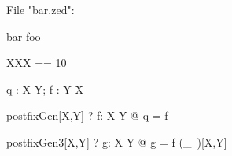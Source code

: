 
File "bar.zed":
\begin{zsection}
 \SECTION bar \parents foo
\end{zsection}

\begin{zed}
   XXX == 10
\end{zed}

\begin{gendef}[X,Y]
    q : X \fun Y; f : Y \fun X
\end{gendef}

\begin{theorem}{postfixGen}[X,Y]
   \vdash? \forall f: X \pfun Y @ q = f\inv
\end{theorem}


\begin{theorem}{postfixGen3}[X,Y]
    \vdash? \forall g: X \fun Y @ g = f (\_~\inv)[X,Y]
\end{theorem}